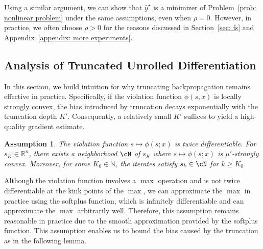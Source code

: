 \documentclass{article}
\def\R{\mathbb{R}}
\def\N{\mathbb{N}}
\newtheorem{assumption}{Assumption}
\def\x{x}
\begin{document}
Using a similar argument, we can show that \( \hat{y}^\star \) is a minimizer of Problem~\ref{prob: nonlinear problem} under the same assumptions, even when \( \rho = 0 \). However, in practice, we often choose \( \rho > 0 \) for the reasons discussed in Section~\ref{sec: fs} and Appendix~\ref{appendix: more experiments}.


\subsection{Analysis of Truncated Unrolled Differentiation}\label{subsec: truncated diff analysis}
In this section, we build intuition for why truncating backpropagation remains effective in practice. Specifically, if the violation function \(\phi(s,x)\) is locally strongly convex, the bias introduced by truncation decays exponentially with the truncation depth \(K'\). Consequently, a relatively small \(K'\) suffices to yield a high-quality gradient estimate.


\begin{assumption}\label{assum: local strongly convex}
    The violation function $s \mapsto \phi(s;\x)$ is twice differentiable. For $s_K \in \R^n$, there exists a neighborhood $\cN$ of $s_K$ where $s \mapsto \phi(s; \x)$ is $\mu'$-strongly convex. 
    Moreover, for some $K_0 \in \N$, the iterates satisfy $s_k \in \cN$ for $k \geq K_0$.
\end{assumption} 
Although the violation function involves a $\operatorname{max}$ operation and is not twice differentiable at the kink points of the $\operatorname{max}$, we can approximate the $\operatorname{max}$ in practice using the softplus function, which is infinitely differentiable and can approximate the $\operatorname{max}$ arbitrarily well. 
Therefore, this assumption remains reasonable in practice due to the smooth approximation provided by the softplus function.
This assumption enables us to bound the bias caused by the truncation as in the following lemma. 
\end{document}
